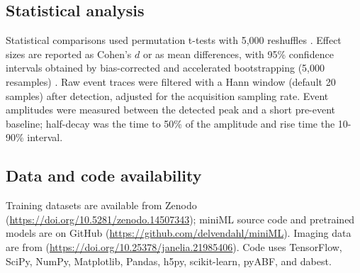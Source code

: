 \documentclass[11pt]{article}
\begin{document}
\subsection{Statistical analysis}
Statistical comparisons used permutation t-tests with 5{,}000 reshuffles
\citep{ho2019estimation}. Effect sizes are reported as Cohen's $d$ or as
mean differences, with 95\% confidence intervals obtained by bias-corrected
and accelerated bootstrapping (5{,}000 resamples) \citep{ho2019estimation}.
Raw event traces were filtered with a Hann window (default 20 samples)
after detection, adjusted for the acquisition sampling rate. Event
amplitudes were measured between the detected peak and a short pre-event
baseline; half-decay was the time to 50\% of the amplitude and rise time
the 10-90\% interval.

\subsection{Data and code availability}
Training datasets are available from Zenodo
(\url{https://doi.org/10.5281/zenodo.14507343}); miniML source code and
pretrained models are on GitHub
(\url{https://github.com/delvendahl/miniML}). Imaging data are from
\citep{aggarwal2023iglusnfr3}
(\url{https://doi.org/10.25378/janelia.21985406}). Code uses TensorFlow,
SciPy, NumPy, Matplotlib, Pandas, h5py, scikit-learn, pyABF, and dabest.



\end{document}
